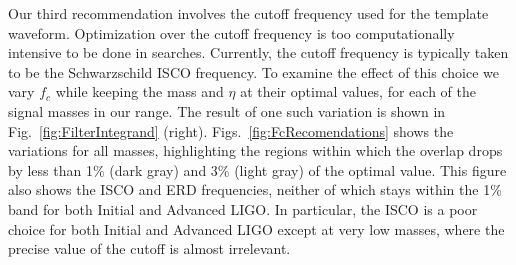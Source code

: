 Our third recommendation involves the cutoff frequency used for the
template waveform.  Optimization over the cutoff frequency is too
computationally intensive to be done in searches.  Currently, the
cutoff frequency is typically taken to be the Schwarzschild ISCO
frequency.  To examine the effect of this choice we vary $f_c$ while
keeping the mass and $\eta$ at their optimal values, for each of the
signal masses in our range.  The result of one such variation is shown
in Fig.~\ref{fig:FilterIntegrand} (right).
Figs.~\ref{fig:FcRecomendations} shows the variations for all masses,
highlighting the regions within which the overlap drops by less than
1\% (dark gray) and 3\% (light gray) of the optimal value.  This
figure also shows the ISCO and ERD frequencies, neither of which stays
within the 1\% band for both Initial and Advanced LIGO.  In
particular, the ISCO is a poor choice for both Initial and Advanced
LIGO except at very low masses, where the precise value of the cutoff
is almost irrelevant.

